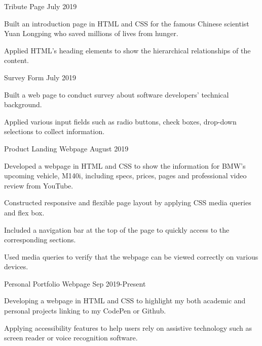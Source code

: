 
\begin{cventries}
  \cventry
    {} %
    {Tribute Page} %
    {} %
    {July 2019} %
    {
      \begin{cvitems} %
      	\item {Built an introduction page in HTML and CSS for the famous Chinese scientist Yuan Longping who saved millions of lives from hunger.}
		\item {Applied HTML's heading elements to show the hierarchical relationships of the content.  }
      \end{cvitems}
    }

    

  \cventry
    {} %
    {Survey Form} %
    {} %
    {July 2019} %
    {
      \begin{cvitems} %
      	\item {Built a web page to conduct survey about software developers' technical background. }
		\item {Applied various input fields such as radio buttons, check boxes, drop-down selections to collect information.}
      \end{cvitems}
    }
    
    \cventry
    {} %
    {Product Landing Webpage} %
    {} %
    {August 2019} %
    {
      \begin{cvitems} %
      	\item {Developed a webpage in HTML and CSS to show the information for
      	BMW's upcoming vehicle, M140i, including specs, prices, pages and professional video review from YouTube. }
		\item {Constructed responsive and flexible page layout by applying CSS media queries and flex box.}
		\item{Included a navigation bar at the top of the page to quickly access to the corresponding sections.}
		\item{Used media queries to verify that the webpage can be viewed correctly on various devices.}
      \end{cvitems}
    }
    
    \cventry
    {} %
    {Personal Portfolio Webpage} %
    {} %
    {Sep 2019-Present} %
    {
      \begin{cvitems} %
      	\item {Developing a webpage in HTML and CSS to highlight my both academic and personal projects linking to my CodePen or Github.}
		\item {Applying accessibility features to help users rely on assistive technology such as screen reader or voice recognition software.}
      \end{cvitems}
    }
    
    
    
    
    
\end{cventries}